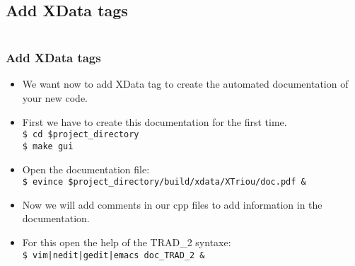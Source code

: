 \documentclass[10pt, hyperref={unicode=true,pdfusetitle, bookmarks=true,bookmarksnumbered=false,bookmarksopen=false, breaklinks=false,pdfborder={0 0 1},backref=true,colorlinks=true,linkcolor=darkblue,pageanchor, urlcolor=darkblue}]{beamer}
\begin{document}
\subsection{{\bf{Add XData tags}}}
\begin{frame}
\begin{columns}[c] 
\tableofcontents[sections={1-4},currentsection, currentsubsection]
\tableofcontents[sections={5-8},currentsection, currentsubsection]
\end{columns}
\end{frame}
\begin{frame}
\frametitle{Add XData tags}
\begin{block}{}

\begin{itemize}
\item We want now to add XData tag to create the automated documentation of your new code.
\item First we have to create this documentation for the first time.\\
\texttt{\$ cd \$project\_directory}\\
\texttt{\$ make gui}
\item Open the documentation file:\\
\texttt{\$ evince \$project\_directory/build/xdata/XTriou/doc.pdf \&}
\item Now we will add comments in our cpp files to add information in the documentation.
\item For this open the help of the TRAD\_2 syntaxe:\\
\texttt{\$ vim|nedit|gedit|emacs doc\_TRAD\_2 \&}
\end{itemize}

\end{block}
\end{frame}
\end{document}
